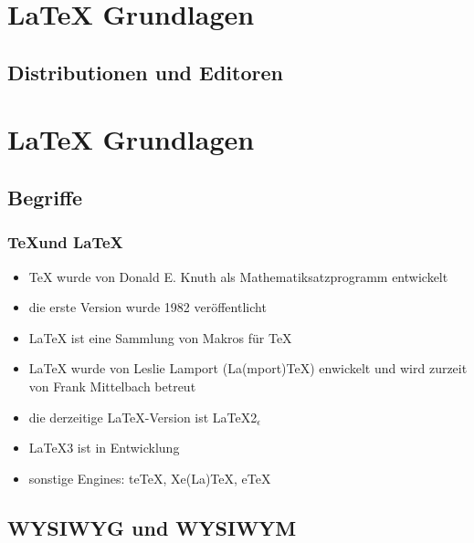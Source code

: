 \documentclass[xelatex,hyperref=xdvipdfmx,11pt]{beamer}
\begin{document}




\section{\LaTeX{} Grundlagen}
\label{sec:grundlagen}


\subsection{Distributionen und Editoren}
\label{sec:install}

\frame{


}

\section{\LaTeX{} Grundlagen}
\label{sec:grundlagen}

\subsection{Begriffe}
\label{sec:begriffe}

\begin{frame}
\frametitle{\TeX und \LaTeX}

\begin{itemize}
\item \TeX{} wurde von Donald E. Knuth als Mathematiksatzprogramm entwickelt
\item die erste Version wurde 1982 veröffentlicht
\item \LaTeX{} ist eine Sammlung von Makros für \TeX
\item \LaTeX{} wurde von Leslie Lamport (La(mport)\TeX ) enwickelt und wird zurzeit
     von Frank Mittelbach betreut
   \item die derzeitige \LaTeX -Version ist LaTeX2$_{\epsilon}$
\item \LaTeX 3 ist in Entwicklung
\item sonstige Engines: teTeX, Xe(La)\TeX{}, eTeX
\end{itemize}
\end{frame}


\subsection{WYSIWYG und WYSIWYM}
\label{sec:wysiwym}
\end{document}
